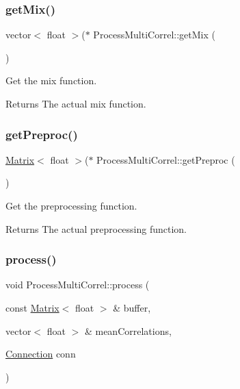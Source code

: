 \subsubsection{\texorpdfstring{get\+Mix()}{getMix()}}
{\footnotesize\ttfamily vector$<$ float $>$($\ast$ Process\+Multi\+Correl\+::get\+Mix (\begin{DoxyParamCaption}{ }\end{DoxyParamCaption})\hspace{0.3cm}{\ttfamily [inline]}}



Get the mix function. 

\begin{DoxyReturn}{Returns}
The actual mix function. 
\end{DoxyReturn}
\mbox{\label{class_process_multi_correl_ae2afc5446a944d835509a8cc68ba4d35}} 
\subsubsection{\texorpdfstring{get\+Preproc()}{getPreproc()}}
{\footnotesize\ttfamily \mbox{\hyperlink{class_matrix}{Matrix}}$<$ float $>$($\ast$ Process\+Multi\+Correl\+::get\+Preproc (\begin{DoxyParamCaption}{ }\end{DoxyParamCaption})\hspace{0.3cm}{\ttfamily [inline]}}



Get the preprocessing function. 

\begin{DoxyReturn}{Returns}
The actual preprocessing function. 
\end{DoxyReturn}
\mbox{\label{class_process_multi_correl_a3f8fed43cb4088f30ae575ff4b99db30}} 
\subsubsection{\texorpdfstring{process()}{process()}}
{\footnotesize\ttfamily void Process\+Multi\+Correl\+::process (\begin{DoxyParamCaption}\item[{const \mbox{\hyperlink{class_matrix}{Matrix}}$<$ float $>$ \&}]{buffer,  }\item[{vector$<$ float $>$ \&}]{mean\+Correlations,  }\item[{\mbox{\hyperlink{class_connection}{Connection}}}]{conn }\end{DoxyParamCaption})}



